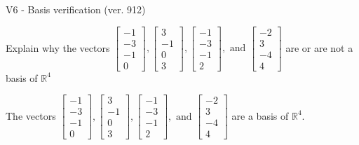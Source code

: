 \begin{exercise}
  \begin{exerciseTitle}V6 - Basis verification (ver. 912)\end{exerciseTitle}
  \begin{exerciseStatement}
    Explain why the vectors \(\left[\begin{array}{r}
-1 \\
-3 \\
-1 \\
0
\end{array}\right] , \left[\begin{array}{r}
3 \\
-1 \\
0 \\
3
\end{array}\right] , \left[\begin{array}{r}
-1 \\
-3 \\
-1 \\
2
\end{array}\right] , \text{ and } \left[\begin{array}{r}
-2 \\
3 \\
-4 \\
4
\end{array}\right]\) are or are not a basis of \(\mathbb{R}^4\)	


  \end{exerciseStatement}
  \begin{exerciseAnswer}
   The vectors \(\left[\begin{array}{r}
-1 \\
-3 \\
-1 \\
0
\end{array}\right] , \left[\begin{array}{r}
3 \\
-1 \\
0 \\
3
\end{array}\right] , \left[\begin{array}{r}
-1 \\
-3 \\
-1 \\
2
\end{array}\right] , \text{ and } \left[\begin{array}{r}
-2 \\
3 \\
-4 \\
4
\end{array}\right]\) 
  	 are  a basis of \(\mathbb{R}^4\).
  


  \end{exerciseAnswer}
\end{exercise}